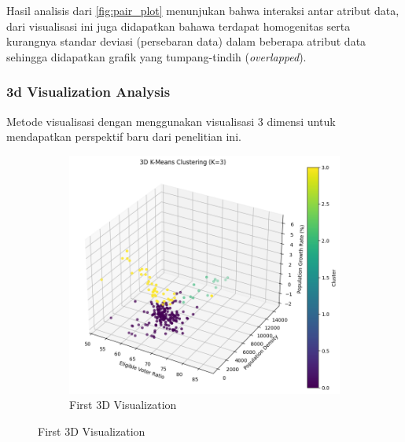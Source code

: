 Hasil analisis dari \ref{fig:pair_plot} menunjukan bahwa interaksi antar atribut data, dari visualisasi ini juga didapatkan bahawa terdapat homogenitas serta kurangnya standar deviasi (persebaran data) dalam beberapa atribut data sehingga didapatkan grafik yang tumpang-tindih (\textit{overlapped}).

\subsubsection{3d Visualization Analysis}
Metode visualisasi dengan menggunakan visualisasi 3 dimensi untuk mendapatkan perspektif baru dari penelitian ini.

\begin{figure}[h]
\begin{subfigure}{0.5\textwidth}
    \includegraphics[width=1\linewidth]{images/first_3d_visual.png}
    \caption{First 3D Visualization}
    \label{fig:first_3d_visual}


\end{subfigure}
\end{figure}
